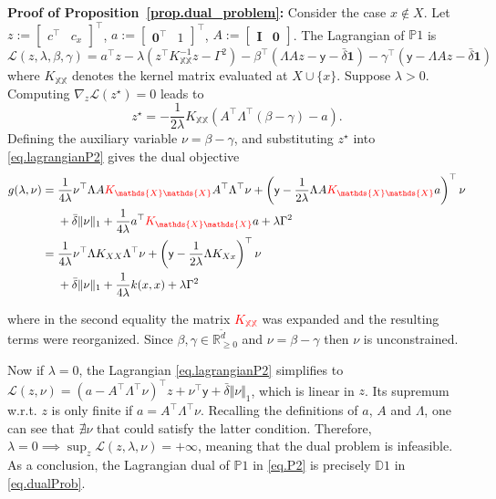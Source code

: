 \begin{my_proof}
	\textbf{Proof of Proposition~\ref{prop.dual_problem}:}
	Consider the case $x \not\in X$. Let $z := \begin{bmatrix} c^\top & c_x\end{bmatrix}^\top$, $a := \begin{bmatrix} \textbf{0}^\top & 1\end{bmatrix}^\top$, $A := \begin{bmatrix} \textbf{I} & \textbf{0}\end{bmatrix}$. The Lagrangian of $\mathds{P}1$ is
	\begin{equation}
		\label{eq.lagrangianP2}
		\mathcal{L}(z,\lambda,\beta,\gamma) = a^\top z - \lambda (z^\top K_{\mathds{X}\mathds{X}}^{-1}z - \Gamma^2) - \beta^\top(\Lambda Az - \mathsf{y} - \bar \delta \textbf{1})- \gamma^\top(\mathsf{y} -\Lambda Az - \bar \delta \textbf{1})
	\end{equation}
	where $K_{\mathds{X}\mathds{X}}$ denotes the kernel matrix evaluated at $X \cup \{x\}$. Suppose $\lambda > 0$. Computing $\nabla_z\mathcal{L}(z^\star) = 0$ leads to
	$$z^\star = -\frac{1}{2\lambda}K_{\mathds{X}\mathds{X}} \left( A^\top \Lambda^\top (\beta - \gamma) - a \right).$$ Defining the auxiliary variable $\nu = \beta - \gamma$, and substituting $z^\star$ into \eqref{eq.lagrangianP2} gives the dual objective
	\begin{align}\notag
		g(\lambda,\nu) 
		=\;& \frac{1}{4\lambda} \nu^\top \Lambda A \textcolor{red}{K_{\mathds{X}\mathds{X}}} A^\top \Lambda^\top \nu + \left(\mathsf{y} - \frac{1}{2\lambda} \Lambda A \textcolor{red}{K_{\mathds{X}\mathds{X}}} a \right)^\top \nu \\
		&+ \bar \delta \Vert \nu \Vert_1 +  \frac{1}{4\lambda} a^\top \textcolor{red}{K_{\mathds{X}\mathds{X}}} a + \lambda \Gamma^2 \\\notag
		=\;& \frac{1}{4\lambda} \nu^\top \Lambda K_{XX} \Lambda^\top \nu + \left(\mathsf{y} - \frac{1}{2\lambda} \Lambda K_{Xx} \right)^\top \nu \\
		&+ \bar \delta \Vert \nu \Vert_1 +  \frac{1}{4\lambda} k(x,x) + \lambda \Gamma^2 \label{eq.dualDerivation}
	\end{align}

	where in the second equality the matrix \textcolor{red}{$K_{\mathds{X}\mathds{X}}$} was expanded and the resulting terms were reorganized. Since $\beta,\gamma \in \mathbb{R}^{\tilde d}_{\geq 0}$ and $\nu = \beta - \gamma$ then $\nu$ is unconstrained.
	
	Now if $\lambda = 0$, the Lagrangian \eqref{eq.lagrangianP2} simplifies to
	$\mathcal{L}(z,\nu) = (a - A^\top \Lambda^\top \nu)^\top z + \nu^\top \mathsf{y} + \bar\delta \Vert \nu \Vert_1 \label{eq.lamZero}$, which is linear in $z$. Its supremum w.r.t. $z$ is only finite if $a = A^\top\Lambda^\top\nu$. Recalling the definitions of $a$, $A$ and $\Lambda$, one can see that $\nexists \nu$ that could satisfy the latter condition. Therefore, $\lambda = 0 \implies \sup_z \mathcal{L}(z,\lambda,\nu) = +\infty$, meaning that the dual problem is infeasible. As a conclusion, the Lagrangian dual of $\mathds{P}1$ in \eqref{eq.P2} is precisely $\mathds{D}1$ in \eqref{eq.dualProb}.
	

\end{my_proof}
